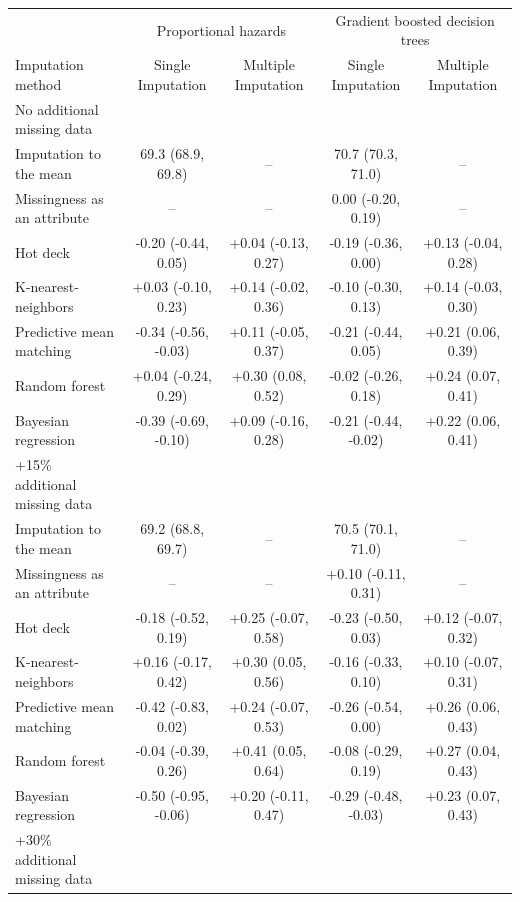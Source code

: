\documentclass{article}
\begin{document}
\begin{table}
\begin{tabular}{lcccc}
\toprule
& \multicolumn{2}{c}{Proportional hazards} & \multicolumn{2}{c}{Gradient boosted decision trees} \\ 
 \cmidrule(lr){2-3}\cmidrule(lr){4-5}
Imputation method & Single Imputation & Multiple Imputation & Single Imputation & Multiple Imputation \\ 
\midrule
\multicolumn{1}{l}{No additional missing data} \\ 
\midrule
Imputation to the mean & 69.3 (68.9, 69.8) & -- & 70.7 (70.3, 71.0) & -- \\ 
Missingness as an attribute & -- & -- & 0.00 (-0.20, 0.19) & -- \\ 
Hot deck & -0.20 (-0.44, 0.05) & +0.04 (-0.13, 0.27) & -0.19 (-0.36, 0.00) & +0.13 (-0.04, 0.28) \\ 
K-nearest-neighbors & +0.03 (-0.10, 0.23) & +0.14 (-0.02, 0.36) & -0.10 (-0.30, 0.13) & +0.14 (-0.03, 0.30) \\ 
Predictive mean matching & -0.34 (-0.56, -0.03) & +0.11 (-0.05, 0.37) & -0.21 (-0.44, 0.05) & +0.21 (0.06, 0.39) \\ 
Random forest & +0.04 (-0.24, 0.29) & +0.30 (0.08, 0.52) & -0.02 (-0.26, 0.18) & +0.24 (0.07, 0.41) \\ 
Bayesian regression & -0.39 (-0.69, -0.10) & +0.09 (-0.16, 0.28) & -0.21 (-0.44, -0.02) & +0.22 (0.06, 0.41) \\ 
\midrule
\multicolumn{1}{l}{+15\% additional missing data} \\ 
\midrule
Imputation to the mean & 69.2 (68.8, 69.7) & -- & 70.5 (70.1, 71.0) & -- \\ 
Missingness as an attribute & -- & -- & +0.10 (-0.11, 0.31) & -- \\ 
Hot deck & -0.18 (-0.52, 0.19) & +0.25 (-0.07, 0.58) & -0.23 (-0.50, 0.03) & +0.12 (-0.07, 0.32) \\ 
K-nearest-neighbors & +0.16 (-0.17, 0.42) & +0.30 (0.05, 0.56) & -0.16 (-0.33, 0.10) & +0.10 (-0.07, 0.31) \\ 
Predictive mean matching & -0.42 (-0.83, 0.02) & +0.24 (-0.07, 0.53) & -0.26 (-0.54, 0.00) & +0.26 (0.06, 0.43) \\ 
Random forest & -0.04 (-0.39, 0.26) & +0.41 (0.05, 0.64) & -0.08 (-0.29, 0.19) & +0.27 (0.04, 0.43) \\ 
Bayesian regression & -0.50 (-0.95, -0.06) & +0.20 (-0.11, 0.47) & -0.29 (-0.48, -0.03) & +0.23 (0.07, 0.43) \\ 
\midrule
\multicolumn{1}{l}{+30\% additional missing data} \\ 

\end{tabular}
\end{table}
\end{document}
